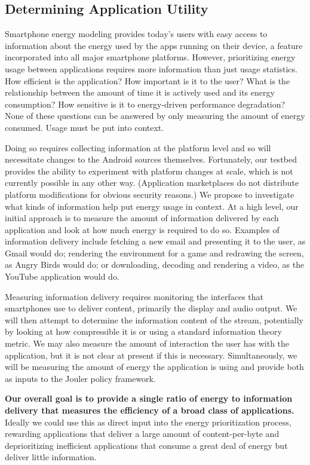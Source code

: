 \subsection{Determining Application Utility}

Smartphone energy modeling provides today's users with easy access to
information about the energy used by the apps running on their device, a
feature incorporated into all major smartphone platforms. However,
prioritizing energy usage between applications requires more information than
just usage statistics. How efficient is the application? How important is it
to the user? What is the relationship between the amount of time it is
actively used and its energy consumption? How sensitive is it to
energy-driven performance degradation? None of these questions can be
answered by only measuring the amount of energy consumed. Usage must be put
into context.

Doing so requires collecting information at the platform level and so will
necessitate changes to the Android sources themselves. Fortunately, our
\PhoneLab{} testbed provides the ability to experiment with platform changes
at scale, which is not currently possible in any other way. (Application
marketplaces do not distribute platform modifications for obvious security
reasons.) We propose to investigate what kinds of information help put energy
usage in context. At a high level, our initial approach is to measure the
amount of information delivered by each application and look at how much
energy is required to do so. Examples of information delivery include
fetching a new email and presenting it to the user, as Gmail would do;
rendering the environment for a game and redrawing the screen, as Angry Birds
would do; or downloading, decoding and rendering a video, as the YouTube
application would do.

Measuring information delivery requires monitoring the interfaces that
smartphones use to deliver content, primarily the display and audio output.
We will then attempt to determine the information content of the stream,
potentially by looking at how compressible it is or using a standard
information theory metric. We may also measure the amount of interaction the
user has with the application, but it is not clear at present if this is
necessary. Simultaneously, we will be measuring the amount of energy the
application is using and provide both as inputs to the Jouler policy
framework. 

\textbf{Our overall goal is to provide a single ratio of energy to
information delivery that measures the efficiency of a broad class of
applications.} Ideally we could use this as direct input into the energy
prioritization process, rewarding applications that deliver a large amount of
content-per-byte and deprioritizing inefficient applications that consume a
great deal of energy but deliver little information.

